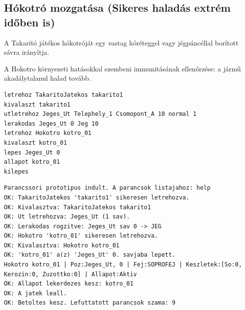 \subsection{Hókotró mozgatása (Sikeres haladás extrém időben is)}
\begin{test-case-description}
    A Takarító játékos hókotróját egy vastag hóréteggel vagy jégpáncéllal borított sávra irányítja.
\end{test-case-description}
\begin{test-case-function}
    A Hokotro környezeti hatásokkal szembeni immunitásának ellenőrzése: a jármű akadálytalanul halad tovább.
\end{test-case-function}
\begin{test-case-input}
\begin{verbatim}
letrehoz TakaritoJatekos takarito1
kivalaszt takarito1
utletrehoz Jeges_Ut Telephely_1 Csomopont_A 10 normal 1
lerakodas Jeges_Ut 0 Jeg 10
letrehoz Hokotro kotro_01
kivalaszt kotro_01
lepes Jeges_Ut 0
allapot kotro_01
kilepes
\end{verbatim}
\end{test-case-input}
\begin{test-case-output}
\begin{verbatim}
Parancssori prototipus indult. A parancsok listajahoz: help
OK: TakaritoJatekos 'takarito1' sikeresen letrehozva.
OK: Kivalasztva: TakaritoJatekos takarito1
OK: Ut letrehozva: Jeges_Ut (1 sav).
OK: Lerakodas rogzitve: Jeges_Ut sav 0 -> JEG
OK: Hokotro 'kotro_01' sikeresen letrehozva.
OK: Kivalasztva: Hokotro kotro_01
OK: 'kotro_01' a(z) 'Jeges_Ut' 0. savjaba lepett.
Hokotro kotro_01 | Poz:Jeges_Ut, 0 | Fej:SOPROFEJ | Keszletek:[So:0, Kerozin:0, Zuzottko:0] | Allapot:Aktiv
OK: Allapot lekerdezes kesz: kotro_01
OK: A jatek leall.
OK: Betoltes kesz. Lefuttatott parancsok szama: 9
\end{verbatim}
\end{test-case-output}

